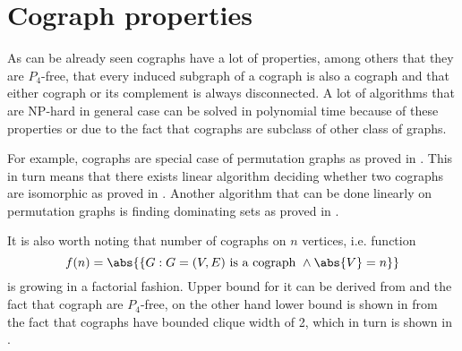 
\section{Cograph properties}

As can be already seen cographs have a lot of properties, among others that they are $P_4$-free, that every induced subgraph of a cograph is also a cograph and that either cograph or its complement is always disconnected. A lot of algorithms that are NP-hard in general case can be solved in polynomial time because of these properties or due to the fact that cographs are subclass of other class of graphs.

For example, cographs are special case of permutation graphs as proved in \cite{bose}. This in turn means that there exists linear algorithm deciding whether two cographs are isomorphic as proved in \cite{colbourn}. Another algorithm that can be done linearly on permutation graphs is finding dominating sets as proved in \cite{chao}.

It is also worth noting that number of cographs on $n$ vertices, i.e. function
\[
    f(n) = \abs{\{G : G = (V,E) \text{ is a cograph } \land \abs{V} = n\}}
\]
is growing in a factorial fashion. Upper bound for it can be derived from \cite{lozin} and the fact that cograph are $P_4$-free, on the other hand lower bound is shown in \cite{allen} from the fact that cographs have bounded clique width of 2, which in turn is shown in \cite{courcelle}.